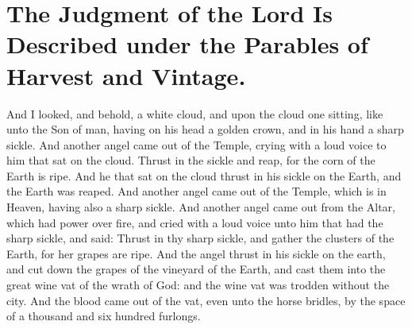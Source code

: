 \chapter[Sermon 66. The Judgment of the Lord Is Described under the Parables of Harvest and Vintage.]{The Judgment of the Lord Is Described under the Parables of Harvest and Vintage.}
\label{sermon:066}

And I looked, and behold, a white cloud, and upon the cloud one sitting, like unto the Son of man, having on his head a golden crown, and in his hand a sharp sickle. And another angel came out of the Temple, crying with a loud voice to him that sat on the cloud. Thrust in the sickle and reap, for the corn of the Earth is ripe. And he that sat on the cloud thrust in his sickle on the Earth, and the Earth was reaped. And another angel came out of the Temple, which is in Heaven, having also a sharp sickle. And another angel came out from the Altar, which had power over fire, and cried with a loud voice unto him that had the sharp sickle, and said: Thrust in thy sharp sickle, and gather the clusters of the Earth, for her grapes are ripe. And the angel thrust in his sickle on the earth, and cut down the grapes of the vineyard of the Earth, and cast them into the great wine vat of the wrath of God: and the wine vat was trodden without the city. And the blood came out of the vat, even unto the horse bridles, by the space of a thousand and six hundred furlongs.

